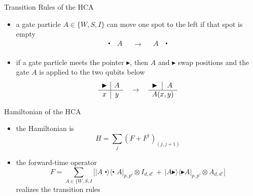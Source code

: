 \documentclass[slideColor]{prosper}
\newcommand{\bul}{\centerdot}
\newcommand{\gat}{\blacktriangleright}
\renewcommand{\>}{\rangle}
\newcommand{\<}{\langle}
\begin{document}
\begin{slide}{Transition Rules of the HCA}

\begin{itemize}
\item
a gate particle $A\in\{W,S,I\}$ can move one spot to the left if that spot is empty
\[
\begin{array}{c|c}
\,\bul\, & A \\
\end{array}
\quad\rightarrow\quad
\begin{array}{c|c}
A & \,\bul\, \\
\end{array}
\]

\item if a gate particle meets the pointer $\gat$, then $A$ and $\gat$ swap positions and the gate $A$ is applied to the two qubits below
\[
\begin{array}{c|c}
\gat & A \\ \hline
x    & y \\
\end{array}
\quad \rightarrow \quad
\begin{array}{c|c}
\gat\, & A \\ \hline
\multicolumn{2}{c}{A(x,y)} \\
\end{array}
\]
\end{itemize}
\end{slide}


\begin{slide}{Hamiltonian of the HCA}

\begin{itemize}
\item the Hamiltonian is 
\[
H = \sum_j ( F + F^\dagger )_{(j,j+1)}
\]

\item the forward-time operator 
\[
F = \sum_{A\in\{W,S,I} \Big[
|A\,\, \bul\>\<\bul\,\, A|_{p,p'} \otimes I_{d,d'} \, + \,
|A \gat\>\<\gat A|_{p,p'} \otimes A_{d,d'} 
\Big]
\]
realizes the transition rules
\end{itemize}
\end{slide}

\end{document}
